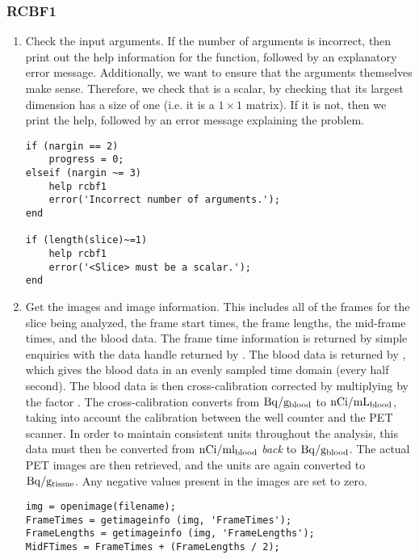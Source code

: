 \subsubsection{RCBF1}
\label{sec:rcbf1_listing}

\begin{enumerate}

\item Check the input arguments.  If the number of arguments is
  incorrect, then print out the help information for the function,
  followed by an explanatory error message.  Additionally, we want to
  ensure that the arguments themselves make sense.  Therefore, we
  check that  is a scalar, by checking that its largest
  dimension has a size of one (i.e. it is a $1 \times 1$ matrix).  If
  it is not, then we print the help, followed by an error message
  explaining the problem.
\begin{verbatim}
if (nargin == 2)
    progress = 0;
elseif (nargin ~= 3)
    help rcbf1
    error('Incorrect number of arguments.');
end

if (length(slice)~=1)
    help rcbf1
    error('<Slice> must be a scalar.');
end
\end{verbatim}

\item Get the images and image information.  This includes all of the
  frames for the slice being analyzed, the frame start times, the
  frame lengths, the mid-frame times, and the blood data.  The frame
  time information is returned by simple enquiries with the data
  handle  returned by .  The blood data is
  returned by , which gives the blood data in an
  evenly sampled time domain (every half second).  The blood data is
  then cross-calibration corrected by multiplying by the factor
  .  The cross-calibration converts from ${\rm Bq} /
  {\rm g_{blood}}$ to ${\rm nCi} / {\rm mL_{blood}}$, taking into
  account the calibration between the well counter and the PET
  scanner.  In order to maintain consistent units throughout the
  analysis, this data must then be converted from ${\rm nCi / ml_{blood}}$
  {\em back} to ${\rm Bq} / {\rm g_{blood}}$.  The actual PET
  images are then retrieved, and the units are again converted to
  ${\rm Bq} / {\rm g_{tissue}}$.  Any negative values present in
  the images are set to zero.
\begin{verbatim}
img = openimage(filename);
FrameTimes = getimageinfo (img, 'FrameTimes');
FrameLengths = getimageinfo (img, 'FrameLengths');
MidFTimes = FrameTimes + (FrameLengths / 2);


\end{verbatim}
\end{enumerate}

